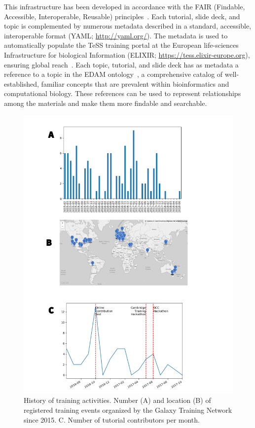 This infrastructure has been developed in accordance with the FAIR (Findable, Accessible, Interoperable, Reusable) principles~\cite{wilkinson2016fair}. Each tutorial, slide deck, and topic is complemented by numerous metadata described in a standard, accessible, interoperable format (YAML; \url{http://yaml.org/}). The metadata is used to automatically populate the TeSS training portal at the European life-sciences Infrastructure for biological Information (ELIXIR; \url{https://tess.elixir-europe.org}), ensuring global reach~\cite{tess2016}. Each topic, tutorial, and slide deck has as metadata a reference to a topic in the EDAM ontology~\cite{ison2013edam}, a comprehensive catalog of well-established, familiar concepts that are prevalent within bioinformatics and computational biology. These references can be used to represent relationships among the materials and make them more findable and searchable.

\begin{figure}[t!]
    \centering
    \includegraphics[width=400pt]{chapters/images/training/training-figure-stats.png}
    \caption{History of training activities. Number (A) and location (B) of registered training events organized by the Galaxy Training Network since 2015. C. Number of tutorial contributors per month.}
    \label{fig:stats}
\end{figure}

